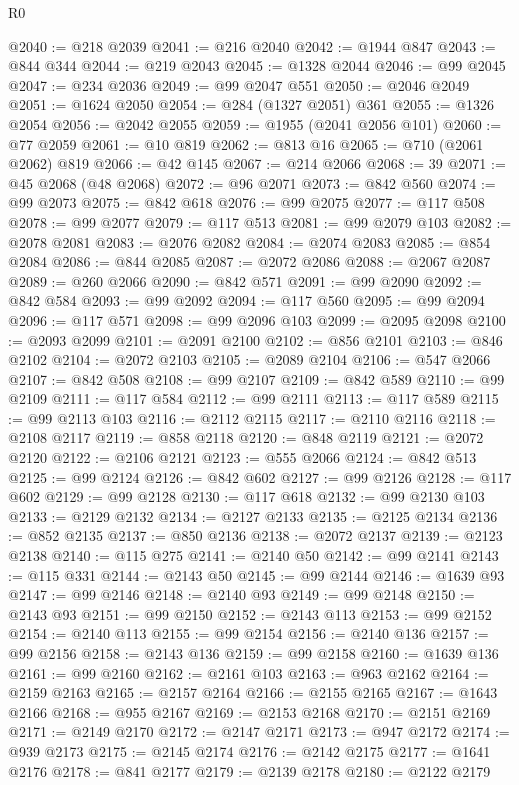 \begin{lexlean}{R0}
\begin{coremodule}
@2040 := @218 @2039
@2041 := @216 @2040
@2042 := @1944 @847
@2043 := @844 @344
@2044 := @219 @2043
@2045 := @1328 @2044
@2046 := @99 @2045
@2047 := @234 @2036
@2049 := @99 @2047 @551
@2050 := @2046 @2049
@2051 := @1624 @2050
@2054 := @284 (@1327 @2051) @361
@2055 := @1326 @2054
@2056 := @2042 @2055
@2059 := @1955 (@2041 @2056 @101)
@2060 := @77 @2059
@2061 := @10 @819
@2062 := @813 @16
@2065 := @710 (@2061 @2062) @819
@2066 := @42 @145
@2067 := @214 @2066
@2068 := 39
@2071 := @45 @2068 (@48 @2068)
@2072 := @96 @2071
@2073 := @842 @560
@2074 := @99 @2073
@2075 := @842 @618
@2076 := @99 @2075
@2077 := @117 @508
@2078 := @99 @2077
@2079 := @117 @513
@2081 := @99 @2079 @103
@2082 := @2078 @2081
@2083 := @2076 @2082
@2084 := @2074 @2083
@2085 := @854 @2084
@2086 := @844 @2085
@2087 := @2072 @2086
@2088 := @2067 @2087
@2089 := @260 @2066
@2090 := @842 @571
@2091 := @99 @2090
@2092 := @842 @584
@2093 := @99 @2092
@2094 := @117 @560
@2095 := @99 @2094
@2096 := @117 @571
@2098 := @99 @2096 @103
@2099 := @2095 @2098
@2100 := @2093 @2099
@2101 := @2091 @2100
@2102 := @856 @2101
@2103 := @846 @2102
@2104 := @2072 @2103
@2105 := @2089 @2104
@2106 := @547 @2066
@2107 := @842 @508
@2108 := @99 @2107
@2109 := @842 @589
@2110 := @99 @2109
@2111 := @117 @584
@2112 := @99 @2111
@2113 := @117 @589
@2115 := @99 @2113 @103
@2116 := @2112 @2115
@2117 := @2110 @2116
@2118 := @2108 @2117
@2119 := @858 @2118
@2120 := @848 @2119
@2121 := @2072 @2120
@2122 := @2106 @2121
@2123 := @555 @2066
@2124 := @842 @513
@2125 := @99 @2124
@2126 := @842 @602
@2127 := @99 @2126
@2128 := @117 @602
@2129 := @99 @2128
@2130 := @117 @618
@2132 := @99 @2130 @103
@2133 := @2129 @2132
@2134 := @2127 @2133
@2135 := @2125 @2134
@2136 := @852 @2135
@2137 := @850 @2136
@2138 := @2072 @2137
@2139 := @2123 @2138
@2140 := @115 @275
@2141 := @2140 @50
@2142 := @99 @2141
@2143 := @115 @331
@2144 := @2143 @50
@2145 := @99 @2144
@2146 := @1639 @93
@2147 := @99 @2146
@2148 := @2140 @93
@2149 := @99 @2148
@2150 := @2143 @93
@2151 := @99 @2150
@2152 := @2143 @113
@2153 := @99 @2152
@2154 := @2140 @113
@2155 := @99 @2154
@2156 := @2140 @136
@2157 := @99 @2156
@2158 := @2143 @136
@2159 := @99 @2158
@2160 := @1639 @136
@2161 := @99 @2160
@2162 := @2161 @103
@2163 := @963 @2162
@2164 := @2159 @2163
@2165 := @2157 @2164
@2166 := @2155 @2165
@2167 := @1643 @2166
@2168 := @955 @2167
@2169 := @2153 @2168
@2170 := @2151 @2169
@2171 := @2149 @2170
@2172 := @2147 @2171
@2173 := @947 @2172
@2174 := @939 @2173
@2175 := @2145 @2174
@2176 := @2142 @2175
@2177 := @1641 @2176
@2178 := @841 @2177
@2179 := @2139 @2178
@2180 := @2122 @2179

\end{coremodule}
\end{lexlean}
